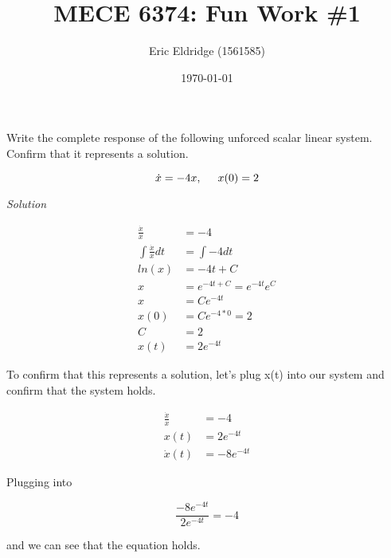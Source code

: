 \documentclass{article}
\title{MECE 6374: Fun Work \#1}
\date{\today}
\author{Eric Eldridge (1561585)}
\begin{document}
  \maketitle

  \section{}

  Write the complete response of the following unforced scalar linear system. Confirm that it represents a solution. 

  \begin{equation*}
    \dot{x} = -4x, \hspace{5mm}x(0)=2
  \end{equation*}

  \noindent \textit{Solution}

  \begin{align}
    \frac{\dot{x}}{x} &= -4 \tag{1.1} \\
    \int \frac{\dot{x}}{x}dt &= \int -4dt \tag{1.2} \\
    ln(x) &= -4t+C \tag{1.3} \\
    x &= e^{-4t+C} = e^{-4t}e^C \tag{1.4}\\
    x &= Ce^{-4t} \tag{1.5} \\
    x(0) &= Ce^{-4*0} = 2 \tag{1.6} \\
    C &= 2 \tag{1.7} \\
    x(t) &= 2e^{-4t} \tag{1.8}
  \end{align}

  To confirm that this represents a solution, let's plug x(t) into our system and confirm that the system holds.

  \begin{align}
    \frac{\dot{x}}{x} &= -4 \tag{1.1} \\
    x(t) &= 2e^{-4t} \tag{1.8} \\
    \dot{x}(t) &= -8e^{-4t} \tag{1.9}
  \end{align}

  Plugging into

  \begin{equation}
    \frac{-8e^{-4t}}{2e^{-4t}} = -4 \tag{1.10}
  \end{equation}
   
  and we can see that the equation holds. 
  
  \newpage
  \section{}
\end{document}
